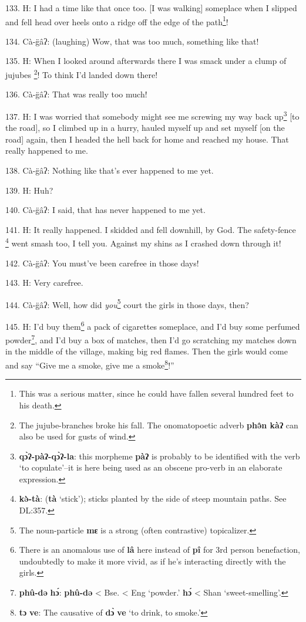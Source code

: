 133. H: I had a time like that once too. [I was walking] someplace when I slipped
and fell head over heels onto a ridge off the edge of the path\footnote{This was a serious matter, since he could have fallen several hundred feet to his death.}!

134. Cà-g̈âʔ: (laughing) Wow, that was too much, something like that!

135. H: When I looked around afterwards there I was smack under a clump of jujubes
\footnote{The jujube-branches broke his fall. The onomatopoetic adverb \textbf{phə̂n kàʔ} can also be used for gusts of wind.}! To think I'd landed down there!

136. Cà-g̈âʔ: That was really too much!

137. H: I was worried that somebody might see me screwing my way back up\footnote{\textbf{qɔ̀ʔ-pàʔ-qɔ̀ʔ-la}: this morpheme \textbf{pàʔ} is probably to be identified with the verb `to copulate'--it is here being used as an obscene pro-verb in an elaborate expression.} [to
the road], so I climbed up in a hurry, hauled myself up and set myself [on the
road] again, then I headed the hell back for home and reached my house. That really
happened to me.

138. Cà-g̈âʔ: Nothing like that's ever happened to me yet.

139. H: Huh?

140. Cà-g̈âʔ: I said, that has never happened to me yet.

141. H: It really happened. I skidded and fell downhill, by God. The safety-fence
\footnote{\textbf{kə̀-tà}: (\textbf{tà} `stick'); sticks planted by the side of steep mountain paths. See DL:357.} went smash too, I tell you. Against my shins as I crashed down through it!

142. Cà-g̈âʔ: You must've been carefree in those days!

143. H: Very carefree.

144. Cà-g̈âʔ: Well, how did \textit{you}\footnote{The noun-particle \textbf{mɛ} is a strong (often contrastive) topicalizer.} court the girls in those days,
then?

145. H: I'd buy them\footnote{There is an anomalous use of \textbf{lâ} here instead of \textbf{pî} for 3rd person benefaction, undoubtedly to make it more vivid, as if he's interacting directly with the girls.} a pack of cigarettes someplace, and I'd buy some perfumed
powder\footnote{\textbf{phû-də} \textbf{hɔ́}: \textbf{phû-də} < Bse. < Eng `powder.' \textbf{hɔ́} < Shan `sweet-smelling'.}, and I'd buy a box of matches, then I'd go scratching my matches down
in the middle of the village, making big red flames. Then the girls would come
and say ``Give me a smoke, give me a smoke\footnote{\textbf{tɔ} \textbf{ve}: The causative of \textbf{dɔ̀} \textbf{ve} `to drink, to smoke.'}!''

